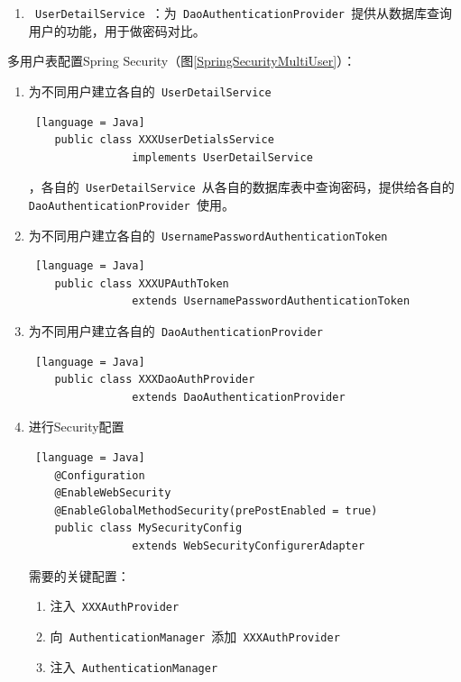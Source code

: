 \begin{enumerate}
\begin{enumerate}
              \item \lstinline[language = Java]| UserDetailService |：为\lstinline[language = Java]| DaoAuthenticationProvider |提供从数据库查询用户的功能，用于做密码对比。
          \end{enumerate}
          多用户表配置Spring Security（图\ref{SpringSecurityMultiUser}）：
          \begin{enumerate}
              \item 为不同用户建立各自的\lstinline[language = Java]| UserDetailService |
                    \begin{lstlisting} [language = Java]
    public class XXXUserDetialsService 
                implements UserDetailService
                \end{lstlisting}
                    ，各自的\lstinline[language = Java]| UserDetailService |从各自的数据库表中查询密码，提供给各自的\lstinline[language = Java]| DaoAuthenticationProvider |使用。
              \item 为不同用户建立各自的\lstinline[language = Java]| UsernamePasswordAuthenticationToken | \begin{lstlisting} [language = Java]
    public class XXXUPAuthToken 
                extends UsernamePasswordAuthenticationToken
              \end{lstlisting}
              \item 为不同用户建立各自的\lstinline[language = Java]| DaoAuthenticationProvider | \begin{lstlisting} [language = Java]
    public class XXXDaoAuthProvider 
                extends DaoAuthenticationProvider
              \end{lstlisting}
              \item 进行Security配置 \begin{lstlisting} [language = Java]
    @Configuration
    @EnableWebSecurity
    @EnableGlobalMethodSecurity(prePostEnabled = true)
    public class MySecurityConfig 
                extends WebSecurityConfigurerAdapter 
              \end{lstlisting}
                    需要的关键配置：\begin{enumerate}
                        \item 注入\lstinline[language = Java]| XXXAuthProvider |
                        \item 向\lstinline[language = Java]| AuthenticationManager |添加\lstinline[language = Java]| XXXAuthProvider |
                        \item 注入\lstinline[language = Java]| AuthenticationManager |

\end{enumerate}
\end{enumerate}
\end{enumerate}
